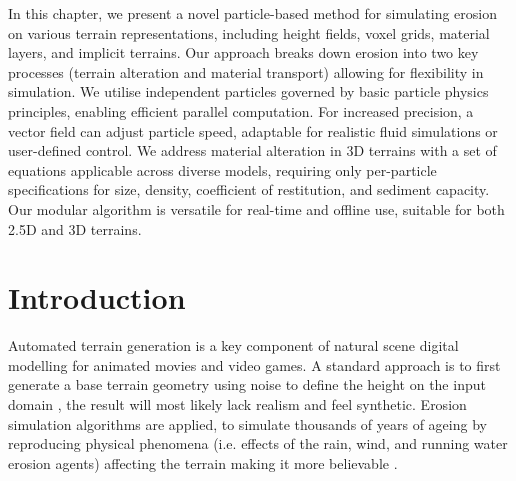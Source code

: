 
\abstract




In this chapter, we present a novel particle-based method for simulating erosion on various terrain representations, including height fields, voxel grids, material layers, and implicit terrains. Our approach breaks down erosion into two key processes (terrain alteration and material transport) allowing for flexibility in simulation. We utilise independent particles governed by basic particle physics principles, enabling efficient parallel computation. For increased precision, a vector field can adjust particle speed, adaptable for realistic fluid simulations or user-defined control. We address material alteration in 3D terrains with a set of equations applicable across diverse models, requiring only per-particle specifications for size, density, coefficient of restitution, and sediment capacity. Our modular algorithm is versatile for real-time and offline use, suitable for both 2.5D and 3D terrains.
\pagebreak

\minitoc

\section{Introduction}
Automated terrain generation is a key component of natural scene digital modelling for animated movies and video games. A standard approach is to first generate a base terrain geometry using noise to define the height on the input domain \cite{Musgrave1989, Olsen2004, Roudier1993}, the result will most likely lack realism and feel synthetic. Erosion simulation algorithms are applied, to simulate thousands of years of ageing by reproducing physical phenomena (i.e. effects of the rain, wind, and running water erosion agents) affecting the terrain making it more believable \cite{Stachniak2005, Smelik2009, Galin2019}.


